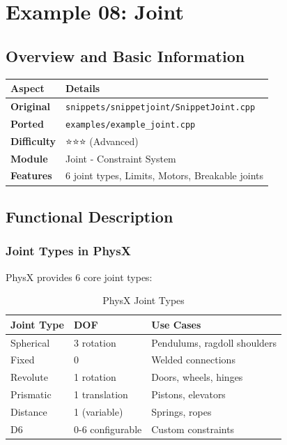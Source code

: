 
\section{Example 08: Joint}

\subsection{Overview and Basic Information}

\begin{table}[h]
\centering
\begin{tabular}{|l|l|}
\hline
\textbf{Aspect} & \textbf{Details} \\
\hline
\textbf{Original} & \texttt{snippets/snippetjoint/SnippetJoint.cpp} \\
\textbf{Ported} & \texttt{examples/example\_joint.cpp} \\
\textbf{Difficulty} & ⭐⭐⭐ (Advanced) \\
\textbf{Module} & Joint - Constraint System \\
\textbf{Features} & 6 joint types, Limits, Motors, Breakable joints \\
\hline
\end{tabular}
\end{table}

\subsection{Functional Description}

\subsubsection{Joint Types in PhysX}

PhysX provides 6 core joint types:

\begin{table}[h]
\centering
\begin{tabular}{|l|l|l|}
\hline
\textbf{Joint Type} & \textbf{DOF} & \textbf{Use Cases} \\
\hline
Spherical & 3 rotation & Pendulums, ragdoll shoulders \\
Fixed & 0 & Welded connections \\
Revolute & 1 rotation & Doors, wheels, hinges \\
Prismatic & 1 translation & Pistons, elevators \\
Distance & 1 (variable) & Springs, ropes \\
D6 & 0-6 configurable & Custom constraints \\
\hline
\end{tabular}
\caption{PhysX Joint Types}
\end{table}

